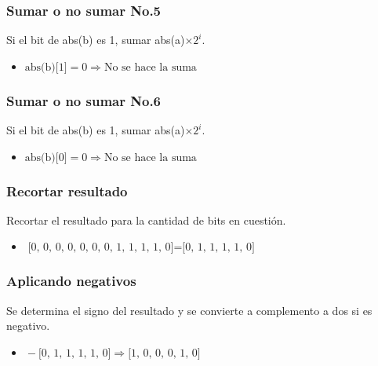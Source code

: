 \documentclass{beamer}
\begin{document}
\begin{frame}
\frametitle{Sumar o no sumar No.5}
Si el bit de abs(b) es 1, sumar abs(a)$\times 2^{i}$.
\begin{itemize}
\item $\text{abs(b)[1]} = \text{0} \Longrightarrow \text{No se hace la suma}$
\end{itemize}
\end{frame}
\begin{frame}
\frametitle{Sumar o no sumar No.6}
Si el bit de abs(b) es 1, sumar abs(a)$\times 2^{i}$.
\begin{itemize}
\item $\text{abs(b)[0]} = \text{0} \Longrightarrow \text{No se hace la suma}$
\end{itemize}
\end{frame}
\begin{frame}
\frametitle{Recortar resultado}
Recortar el resultado para la cantidad de bits en cuestión.
\begin{itemize}
\item $\text{[0, 0, 0, 0, 0, 0, 0, 1, 1, 1, 1, 0]} = \text{[0, 1, 1, 1, 1, 0]}$
\end{itemize}
\end{frame}
\begin{frame}
\frametitle{Aplicando negativos}
Se determina el signo del resultado y se convierte a complemento a dos si es negativo.
\begin{itemize}
\item $\text{} - \text{[0, 1, 1, 1, 1, 0]} \Longrightarrow \text{[1, 0, 0, 0, 1, 0]}$
\end{itemize}
\end{frame}

\begin{frame}
\maketitle
{}
\end{frame}
\end{document}
